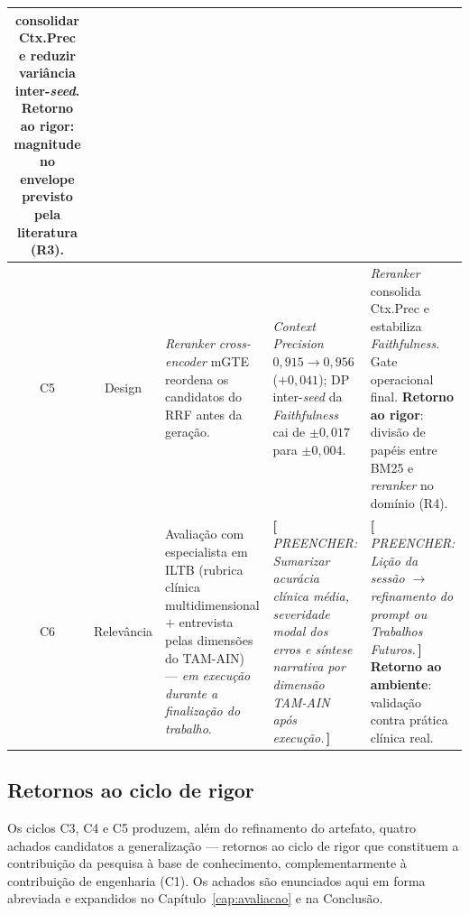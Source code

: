 \documentclass[
  12pt,
  oneside,
  a4paper,
  english,
  brazil
]{abntex2}
\newcommand{\aluno}[1]{{\color{olive!80!black}\textbf{[\,}{\small\itshape PREENCHER: #1}\textbf{\,]}}}
\begin{document}
\begin{quadro}[!htbp]
\begin{tabularx}{\textwidth}{|c|c|X|X|X|}
       consolidar Ctx.Prec e reduzir variância inter-\emph{seed}.
       \textbf{Retorno ao rigor}: magnitude no envelope previsto pela
       literatura (R3). \\ \hline
  C5 & Design & \textit{Reranker} \emph{cross-encoder} mGTE reordena
       os candidatos do RRF antes da geração. &
       \textit{Context Precision} $0{,}915 \to 0{,}956$ ($+0{,}041$);
       DP inter-\emph{seed} da \textit{Faithfulness} cai de
       $\pm 0{,}017$ para $\pm 0{,}004$. &
       \emph{Reranker} consolida Ctx.Prec e estabiliza
       \textit{Faithfulness}. Gate operacional final.
       \textbf{Retorno ao rigor}: divisão de papéis entre BM25 e
       \emph{reranker} no domínio (R4). \\ \hline
  C6 & Relevância & Avaliação com especialista em ILTB (rubrica
       clínica multidimensional $+$ entrevista pelas dimensões do
       TAM-AIN) --- \emph{em execução durante a finalização do
       trabalho}. &
       \aluno{Sumarizar acurácia clínica média, severidade modal dos
       erros e síntese narrativa por dimensão TAM-AIN após execução.} &
       \aluno{Lição da sessão $\to$ refinamento do \textit{prompt} ou
       \textit{Trabalhos Futuros}.} \textbf{Retorno ao ambiente}:
       validação contra prática clínica real. \\ \hline
  \end{tabularx}
  \caption*{Fonte: Produção do próprio autor. Coluna \emph{Hevner}
            classifica cada ciclo frente aos três ciclos de
            \citeauthor{hevner2007} (\citeyear{hevner2007}): Design
            (iteração interna construir/avaliar), Rigor (retorno à
            base de conhecimento), Relevância (retorno ao ambiente).
            C1--C2 referem-se à Fase 2 (Tabela~\ref{tab:ragas}); C3--C5
            às iterações pós-replicação multi-\emph{seed}
            (Tabelas~\ref{tab:ablacao-2x2} e \ref{tab:hybrid-rerank});
            C6 à avaliação humana (Seção~\ref{sec:sessao-expert}).}
\end{quadro}

\subsection*{Retornos ao ciclo de rigor}
\label{sec:retornos-rigor}

Os ciclos C3, C4 e C5 produzem, além do refinamento do artefato,
quatro achados candidatos a generalização --- retornos ao ciclo de
rigor que constituem a contribuição da pesquisa à base de
conhecimento, complementarmente à contribuição de engenharia (C1).
Os achados são enunciados aqui em forma abreviada e expandidos no
Capítulo~\ref{cap:avaliacao} e na Conclusão.
\end{document}
